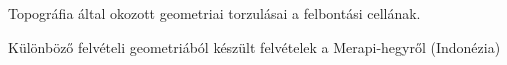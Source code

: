 \begin{frame}{\ft}
    \begin{minic}{0.64}
        \centering
        
        Topográfia által okozott geometriai torzulásai a felbontási cellának.
    \end{minic}
\end{frame}


\begin{frame}{\ft}
    \begin{minic}{0.85}
        \centering
        
        Különböző felvételi geometriából készült felvételek a Merapi-hegyről (Indonézia)
    \end{minic}
\end{frame}
